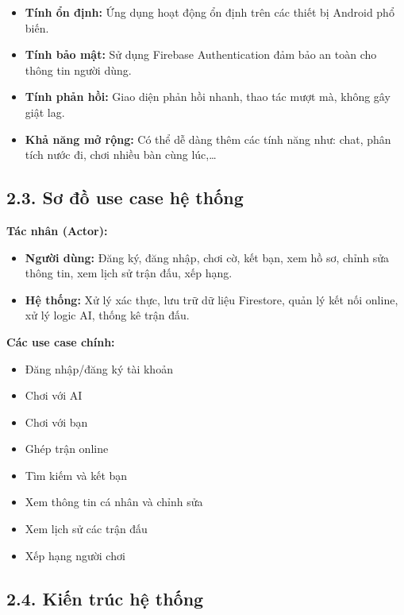 \documentclass[a4paper,12pt]{article}
\begin{document}
\justify
\begin{itemize}[label=·]
    \item \textbf{Tính ổn định:} Ứng dụng hoạt động ổn định trên các thiết bị Android phổ biến.
    \item \textbf{Tính bảo mật:} Sử dụng Firebase Authentication đảm bảo an toàn cho thông tin người dùng.
    \item \textbf{Tính phản hồi:} Giao diện phản hồi nhanh, thao tác mượt mà, không gây giật lag.
    \item \textbf{Khả năng mở rộng:} Có thể dễ dàng thêm các tính năng như: chat, phân tích nước đi, chơi nhiều bàn cùng lúc,…
\end{itemize}

\subsection*{2.3. Sơ đồ use case hệ thống} %

\justify
\noindent \textbf{Tác nhân (Actor):}
\begin{itemize}[label=·]
    \item \textbf{Người dùng:} Đăng ký, đăng nhập, chơi cờ, kết bạn, xem hồ sơ, chỉnh sửa thông tin, xem lịch sử trận đấu, xếp hạng.
    \item \textbf{Hệ thống:} Xử lý xác thực, lưu trữ dữ liệu Firestore, quản lý kết nối online, xử lý logic AI, thống kê trận đấu.
\end{itemize}

\noindent \textbf{Các use case chính:}
\begin{itemize}[label=·]
    \item Đăng nhập/đăng ký tài khoản
    \item Chơi với AI
    \item Chơi với bạn
    \item Ghép trận online
    \item Tìm kiếm và kết bạn
    \item Xem thông tin cá nhân và chỉnh sửa
    \item Xem lịch sử các trận đấu
    \item Xếp hạng người chơi
\end{itemize}

\subsection*{2.4. Kiến trúc hệ thống} %
\end{document}
